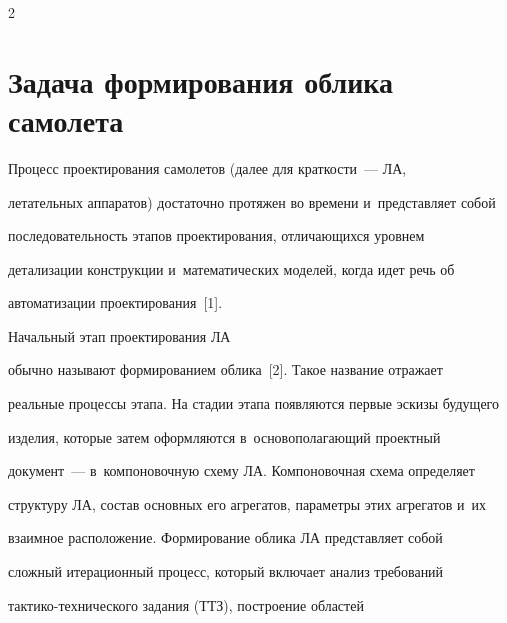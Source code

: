 




\thispagestyle{headings}





\begin{multicols}{2}





\label{st\stat}


  


\section{Задача формирования облика самолета}










  Процесс проектирования самолетов (далее для краткости~--- ЛА, 


летательных аппаратов) достаточно протяжен во времени и~представляет собой\linebreak 


последовательность этапов проектирования, отличающихся уровнем 


детализации конструкции и~математических моделей, когда идет речь об 


автоматизации проектирования~[1]. 


Начальный этап \mbox{проектирования} ЛА 


обычно называют формированием облика~[2]. Такое название отражает 


реальные процессы этапа. На стадии этапа появляются первые эскизы будущего 


изделия, которые \mbox{затем} оформляются в~основополагающий проектный 


документ~--- в~компоновочную схему ЛА. Компоновочная схема определяет 


структуру ЛА, состав основных его агрегатов, параметры этих агрегатов и~их 


взаимное расположение. Формирование облика ЛА представляет собой 


сложный итерационный процесс, который включает анализ требований  


так\-ти\-ко-тех\-ни\-че\-ско\-го задания (ТТЗ), построение областей 



\end{multicols}
